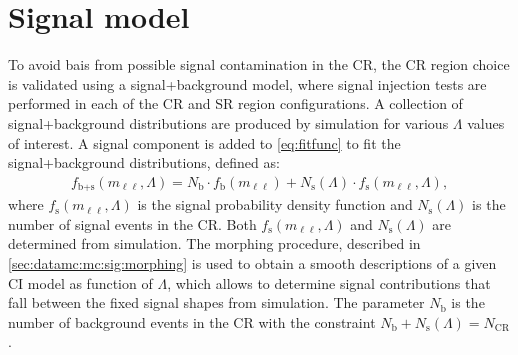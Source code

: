 \section{Signal model}\label{sec:sigmodel}
To avoid bais from possible signal contamination in the CR, the CR region choice is validated using a signal+background model, where signal injection tests are performed in each of the CR and SR region configurations. A collection of signal+background distributions are produced by simulation for various $\Lambda$ values of interest. A signal component is added to \cref{eq:fitfunc} to fit the signal+background distributions, defined as: 
\begin{equation}
    \label{eq:sbfunction}
    \begin{aligned}
    f_\textrm{b+s}(m_{\ell\ell},\Lambda) = N_\textrm{b}\cdot f_\textrm{b}(m_{\ell\ell}) + N_\textrm{s}(\Lambda)\cdot f_\textrm{s}(m_{\ell\ell},\Lambda),
    \end{aligned} 
\end{equation}
where $f_\textrm{s}(m_{\ell\ell},\Lambda)$ is the signal probability density function and $N_\textrm{s}(\Lambda)$ is the number of signal events in the CR. Both $f_\textrm{s}(m_{\ell\ell},\Lambda)$ and $N_\textrm{s}(\Lambda)$ are determined from simulation. The morphing procedure, described in \cref{sec:datamc:mc:sig:morphing} is used to obtain a smooth descriptions of a given CI model as function of $\Lambda$, which allows to determine signal contributions that fall between the fixed signal shapes from simulation. The parameter $N_\textrm{b}$ is the number of background events in the CR with the constraint $N_\textrm{b}+N_\textrm{s}(\Lambda)=N_\textrm{CR}$.  


